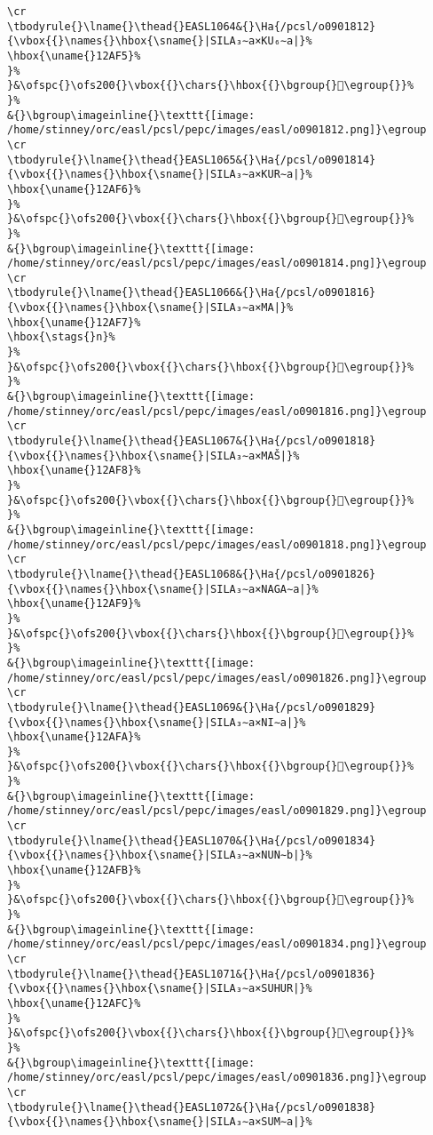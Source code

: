 \begin{verbatim}
\cr
\tbodyrule{}\lname{}\thead{}EASL1064&{}\Ha{/pcsl/o0901812}{\vbox{{}\names{}\hbox{\sname{}|SILA₃∼a×KU₆∼a|}%
\hbox{\uname{}12AF5}%
}%
}&\ofspc{}\ofs200{}\vbox{{}\chars{}\hbox{{}\bgroup{}𒫵\egroup{}}%
}%
&{}\bgroup\imageinline{}\texttt{[image: /home/stinney/orc/easl/pcsl/pepc/images/easl/o0901812.png]}\egroup
\cr
\tbodyrule{}\lname{}\thead{}EASL1065&{}\Ha{/pcsl/o0901814}{\vbox{{}\names{}\hbox{\sname{}|SILA₃∼a×KUR∼a|}%
\hbox{\uname{}12AF6}%
}%
}&\ofspc{}\ofs200{}\vbox{{}\chars{}\hbox{{}\bgroup{}𒫶\egroup{}}%
}%
&{}\bgroup\imageinline{}\texttt{[image: /home/stinney/orc/easl/pcsl/pepc/images/easl/o0901814.png]}\egroup
\cr
\tbodyrule{}\lname{}\thead{}EASL1066&{}\Ha{/pcsl/o0901816}{\vbox{{}\names{}\hbox{\sname{}|SILA₃∼a×MA|}%
\hbox{\uname{}12AF7}%
\hbox{\stags{}n}%
}%
}&\ofspc{}\ofs200{}\vbox{{}\chars{}\hbox{{}\bgroup{}𒫷\egroup{}}%
}%
&{}\bgroup\imageinline{}\texttt{[image: /home/stinney/orc/easl/pcsl/pepc/images/easl/o0901816.png]}\egroup
\cr
\tbodyrule{}\lname{}\thead{}EASL1067&{}\Ha{/pcsl/o0901818}{\vbox{{}\names{}\hbox{\sname{}|SILA₃∼a×MAŠ|}%
\hbox{\uname{}12AF8}%
}%
}&\ofspc{}\ofs200{}\vbox{{}\chars{}\hbox{{}\bgroup{}𒫸\egroup{}}%
}%
&{}\bgroup\imageinline{}\texttt{[image: /home/stinney/orc/easl/pcsl/pepc/images/easl/o0901818.png]}\egroup
\cr
\tbodyrule{}\lname{}\thead{}EASL1068&{}\Ha{/pcsl/o0901826}{\vbox{{}\names{}\hbox{\sname{}|SILA₃∼a×NAGA∼a|}%
\hbox{\uname{}12AF9}%
}%
}&\ofspc{}\ofs200{}\vbox{{}\chars{}\hbox{{}\bgroup{}𒫹\egroup{}}%
}%
&{}\bgroup\imageinline{}\texttt{[image: /home/stinney/orc/easl/pcsl/pepc/images/easl/o0901826.png]}\egroup
\cr
\tbodyrule{}\lname{}\thead{}EASL1069&{}\Ha{/pcsl/o0901829}{\vbox{{}\names{}\hbox{\sname{}|SILA₃∼a×NI∼a|}%
\hbox{\uname{}12AFA}%
}%
}&\ofspc{}\ofs200{}\vbox{{}\chars{}\hbox{{}\bgroup{}𒫺\egroup{}}%
}%
&{}\bgroup\imageinline{}\texttt{[image: /home/stinney/orc/easl/pcsl/pepc/images/easl/o0901829.png]}\egroup
\cr
\tbodyrule{}\lname{}\thead{}EASL1070&{}\Ha{/pcsl/o0901834}{\vbox{{}\names{}\hbox{\sname{}|SILA₃∼a×NUN∼b|}%
\hbox{\uname{}12AFB}%
}%
}&\ofspc{}\ofs200{}\vbox{{}\chars{}\hbox{{}\bgroup{}𒫻\egroup{}}%
}%
&{}\bgroup\imageinline{}\texttt{[image: /home/stinney/orc/easl/pcsl/pepc/images/easl/o0901834.png]}\egroup
\cr
\tbodyrule{}\lname{}\thead{}EASL1071&{}\Ha{/pcsl/o0901836}{\vbox{{}\names{}\hbox{\sname{}|SILA₃∼a×SUHUR|}%
\hbox{\uname{}12AFC}%
}%
}&\ofspc{}\ofs200{}\vbox{{}\chars{}\hbox{{}\bgroup{}𒫼\egroup{}}%
}%
&{}\bgroup\imageinline{}\texttt{[image: /home/stinney/orc/easl/pcsl/pepc/images/easl/o0901836.png]}\egroup
\cr
\tbodyrule{}\lname{}\thead{}EASL1072&{}\Ha{/pcsl/o0901838}{\vbox{{}\names{}\hbox{\sname{}|SILA₃∼a×SUM∼a|}%

\end{verbatim}
